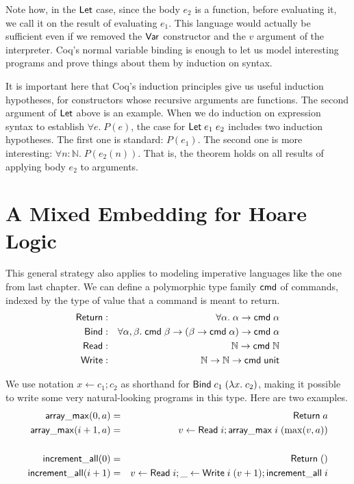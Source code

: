 \documentclass{amsbook}
\theoremstyle{definition}
\theoremstyle{remark}
\numberwithin{section}{chapter}
\numberwithin{equation}{chapter}
\begin{document}
Note how, in the $\mathsf{Let}$ case, since the body $e_2$ is a function, before evaluating it, we call it on the result of evaluating $e_1$.
This language would actually be sufficient even if we removed the $\mathsf{Var}$ constructor and the $v$ argument of the interpreter.
Coq's normal variable binding is enough to let us model interesting programs and prove things about them by induction on syntax.

It is important here that Coq's induction principles give us useful induction hypotheses, for constructors whose recursive arguments are functions.
The second argument of $\mathsf{Let}$ above is an example.
When we do induction on expression syntax to establish $\forall e. \; P(e)$, the case for $\mathsf{Let} \; e_1 \; e_2$ includes two induction hypotheses.
The first one is standard: $P(e_1)$.
The second one is more interesting: $\forall n : \mathbb N. \; P(e_2(n))$.
That is, the theorem holds on all results of applying body $e_2$ to arguments.


\section{A Mixed Embedding for Hoare Logic}

This general strategy also applies to modeling imperative languages like the one from last chapter.
We can define a polymorphic type family $\mathsf{cmd}$ of commands, indexed by the type of value that a command is meant to return.
\encoding
\begin{eqnarray*}
  \mathsf{Return} &:& \forall \alpha. \; \alpha \to \mathsf{cmd} \; \alpha \\
  \mathsf{Bind} &:& \forall \alpha, \beta. \; \mathsf{cmd} \; \beta \to (\beta \to \mathsf{cmd} \; \alpha) \to \mathsf{cmd} \; \alpha \\
  \mathsf{Read} &:& \mathbb N \to \mathsf{cmd} \; \mathbb N \\
  \mathsf{Write} &:& \mathbb N \to \mathbb N \to \mathsf{cmd} \; \mathsf{unit}
\end{eqnarray*}

We use notation $x \leftarrow c_1; c_2$ as shorthand for $\mathsf{Bind} \; c_1 \; (\lambda x. \; c_2)$, making it possible to write some very natural-looking programs in this type.
Here are two examples.
\begin{eqnarray*}
  \mathsf{array\_max}(0, a) &=& \mathsf{Return} \; a \\
  \mathsf{array\_max}(i+1, a) &=& v \leftarrow \mathsf{Read} \; i; \mathsf{array\_max} \; i \; (\max(v, a)) \\
  \\
  \mathsf{increment\_all}(0) &=& \mathsf{Return} \; () \\
  \mathsf{increment\_all}(i+1) &=& v \leftarrow \mathsf{Read} \; i; \_ \leftarrow \mathsf{Write} \; i \; (v+1); \mathsf{increment\_all} \; i
\end{eqnarray*}
\end{document}
